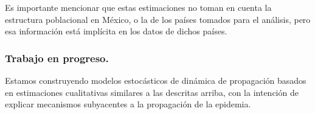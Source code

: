Es importante mencionar que estas estimaciones no toman en cuenta la estructura poblacional en México, o la de los países tomados para el análisis, pero esa información está implícita en los datos de dichos países. 


\subsubsection*{Trabajo en progreso.} Estamos construyendo modelos estocásticos de dinámica de propagación basados en estimaciones cualitativas similares a las descritas arriba, con la intención de explicar mecanismos subyacentes a la propagación de la epidemia.  


